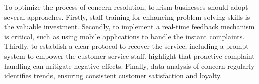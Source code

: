 To optimize the process of concern resolution, tourism businesses should adopt several approaches. Firstly, staff training for enhancing problem-solving skills is the valuable investment. Secondly, to implement a real-time feedback mechanism is critical, such as using mobile applications to handle the instant complaints. Thirdly, to establish a clear protocol to recover the service, including a prompt system to empower the customer service staff. \cite{SparksSoBradley2016NegativeReviews} highlight that proactive complaint handling can mitigate negative effects. Finally, data analysis of concern regularly identifies trends, ensuring consistent customer satisfaction and loyalty.
